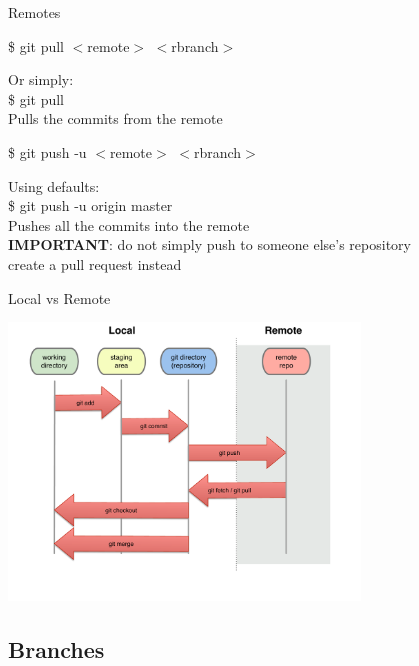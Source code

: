 \documentclass[10pt,xcolor=dvipsnames]{beamer}
\begin{document}
\begin{frame}{Remotes}

\begin{block}{}
\$ git pull $<$remote$>$ $<$rbranch$>$
\end{block}
Or simply:\\
\$ git pull\\
Pulls the commits from the remote\\[0.2in]

\begin{block}{}
\$ git push -u $<$remote$>$ $<$rbranch$>$
\end{block}
Using defaults:\\
\$ git push -u origin master\\
Pushes all the commits into the remote\\[0.2in]
{\bf IMPORTANT}: do not simply push to someone else's repository\\
create a pull request instead
\end{frame}


\begin{frame}{Local vs Remote}
\begin{center}
\includegraphics[width = 0.7\textwidth]{diagrams-lifecycle_remote.pdf}
\end{center}
\end{frame}

\subsection{Branches}
\end{document}
